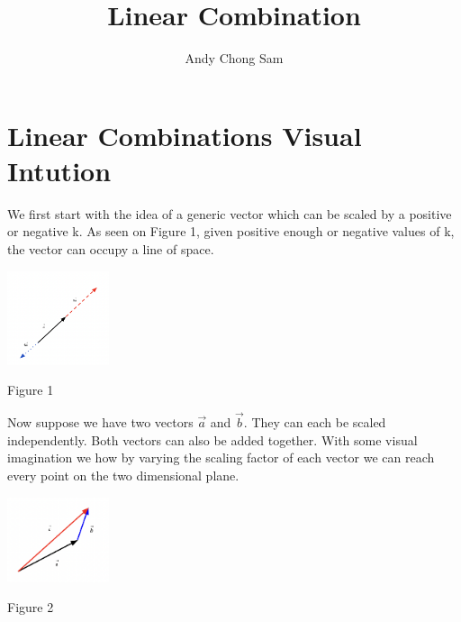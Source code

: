 \documentclass{article}
\begin{document}
	
\title{Linear Combination}
\author{Andy Chong Sam}

\maketitle	

\section{Linear Combinations Visual Intution}
\begin{minipage}[c]{.5\linewidth}
	\par \noindent We first start with the idea of a generic vector which can be scaled by a positive or negative k. As seen on Figure 1, given positive enough or negative values of k, the vector can occupy a line of space.
\end{minipage}%
\begin{minipage}[c]{.5\linewidth}
\begin{center}
	\includegraphics[width=3cm]{matrix-scaling-1.png}
\end{center}
\begin{center}
	Figure 1	
\end{center}
\end{minipage}
\linebreak
\linebreak
\linebreak
\begin{minipage}[c]{.5\linewidth}
	\par \noindent Now suppose we have two vectors \( \vec a \) and \( \vec b \).  They can each be scaled independently. Both vectors can also be added together. With some visual imagination we how by varying the scaling factor of each vector we can reach every point on the two dimensional plane.
\end{minipage}%
\begin{minipage}[c]{.5\linewidth}
\begin{center}
	\includegraphics[width=3cm]{vector-scaling-2.png}
\end{center}
\begin{center}
	Figure 2	
\end{center}
\end{minipage}
\end{document}
